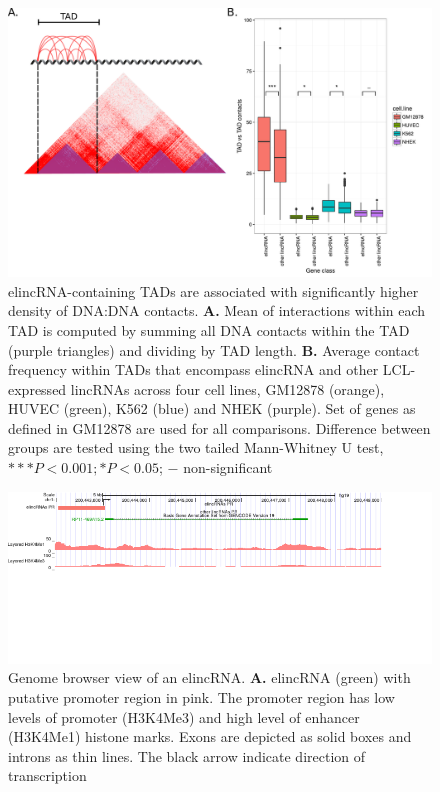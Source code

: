 \documentclass[11pt,a4paper]{report}
\begin{document}
\begin{figure}[ht]
	\includegraphics[width=1\textwidth]{Figures/5_TAD_TAD_contact.pdf}
	\caption{elincRNA-containing TADs are associated with significantly higher density of DNA:DNA contacts. \textbf{A.} Mean of interactions within each TAD is computed by summing all DNA contacts within the TAD (purple triangles) and dividing by TAD length. \textbf{B.} Average contact frequency within TADs that encompass elincRNA and other LCL-expressed lincRNAs across four cell lines, GM12878 (orange), HUVEC (green), K562 (blue) and NHEK (purple). Set of genes as defined in GM12878 are used for all comparisons. Difference between groups are tested using the two tailed Mann-Whitney U test, $***P<0.001; *P<0.05$; $-$ non-significant}
	\label{TAD_TAD_contacts}
\end{figure}

\begin{figure}[ht]
	\includegraphics[width=1\textwidth]{Figures/7_merged_examples.pdf}
	\caption{Genome browser view of an elincRNA. \textbf{A.} elincRNA (green) with putative promoter region in pink. The promoter region has low levels of promoter (H3K4Me3) and high level of enhancer (H3K4Me1) histone marks. Exons are depicted as solid boxes and introns as thin lines. The black arrow indicate direction of transcription}
	\label{Genome_browser}
\end{figure}
\end{document}
